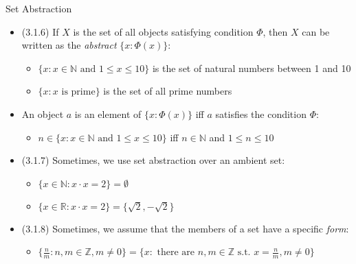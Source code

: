 \begin{frame}{Set Abstraction}


	\begin{itemize}

		\item (3.1.6) If $X$ is the set of all objects satisfying condition $\Phi$, then $X$ can be written as the \emph{abstract} $\{x:\Phi(x)\}$:
		
		\begin{itemize}
		
			\item $\{x: x\in\mathbb{N}\text{ and }1\leq x\leq 10\}$ is the set of natural numbers between 1 and 10
			
			\item $\{x: x\text{ is prime}\}$ is the set of all prime numbers
		
		\end{itemize}
		
		\item An object $a$ is an element of $\{x:\Phi(x)\}$ iff $a$ satisfies the condition $\Phi$:
		
		\begin{itemize}
					
			\item $n\in \{x: x\in\mathbb{N}\text{ and }1\leq x\leq 10\}$ iff $n\in\mathbb{N}$ and $1\leq n\leq 10$
		
		\end{itemize}
		
		\item (3.1.7) Sometimes, we use set abstraction over an ambient set:
		
		\begin{itemize}
		
			\item $\{x\in \mathbb{N}:x\cdot x=2\}=\emptyset$
			
			\item $\{x\in \mathbb{R}:x\cdot x=2\}=\{\sqrt{2},-\sqrt{2}\}$
					
		\end{itemize}
		
		\item (3.1.8) Sometimes, we assume that the members of a set have a specific \emph{form}:
	
		\begin{itemize}
		
			\item $\{\frac{n}{m}:n,m\in \mathbb{Z},m\neq 0\}=\{x: \text{ there are }n,m\in \mathbb{Z}\text{ s.t. }x=\frac{n}{m},m\neq 0 \}$
		
		\end{itemize}
	
	\end{itemize}

\end{frame}

